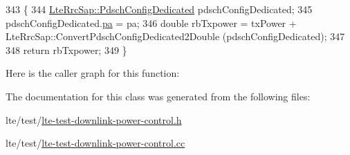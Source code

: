 \begin{DoxyCode}
343 \{
344   \hyperlink{structns3_1_1LteRrcSap_1_1PdschConfigDedicated}{LteRrcSap::PdschConfigDedicated} pdschConfigDedicated;
345   pdschConfigDedicated.\hyperlink{structns3_1_1LteRrcSap_1_1PdschConfigDedicated_aa9b1574a63fb83c53649305ca95aeb31}{pa} = pa;
346   \textcolor{keywordtype}{double} rbTxpower = txPower + LteRrcSap::ConvertPdschConfigDedicated2Double (pdschConfigDedicated);
347 
348   \textcolor{keywordflow}{return} rbTxpower;
349 \}
\end{DoxyCode}


Here is the caller graph for this function\+:




The documentation for this class was generated from the following files\+:\begin{DoxyCompactItemize}
\item 
lte/test/\hyperlink{lte-test-downlink-power-control_8h}{lte-\/test-\/downlink-\/power-\/control.\+h}\item 
lte/test/\hyperlink{lte-test-downlink-power-control_8cc}{lte-\/test-\/downlink-\/power-\/control.\+cc}\end{DoxyCompactItemize}
